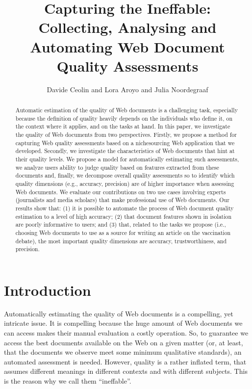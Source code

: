 \documentclass{llncs}
\title{Capturing the Ineffable:\\Collecting, Analysing and Automating Web Document Quality Assessments}
\author{Davide Ceolin\inst{1} and Lora Aroyo\inst{1} and Julia Noordegraaf\inst{2}}
\institute{\email{\{d.ceolin,lora.aroyo\}@vu.nl}\\VU University Amsterdam\\ de Boelelaan 1081a\\ 1081HV\\ Amsterdam, The Netherlands \and \email{j.j.noordegraaf@uva.nl} \\ University of Amsterdam}
\begin{document}
\maketitle
\begin{abstract}
Automatic estimation of the quality of Web documents is a challenging task, especially because the definition of quality heavily depends on the individuals who define it, on the context where it applies, and on the tasks at hand. 
In this paper, we investigate the quality of Web documents from two perspectives. Firstly, we propose a method for capturing Web quality assessments based on a nichesourcing Web application that we developed. Secondly, we investigate the characteristics of Web documents that hint at their quality levels. We propose a model for automatically estimating such assessments, we analyze users ability to judge quality based on features extracted from these documents and, finally, we decompose overall quality assessments so to identify which quality dimensions (e.g., accuracy, precision) are of higher importance when assessing Web documents.
We evaluate our contributions on two use cases involving experts (journalists and media scholars) that make professional use of Web documents. Our results show that: (1) it is possible to automate the process of Web document quality estimation to a level of high accuracy; (2) that document features shown in isolation are poorly informative to users; and (3) that, related to the tasks we propose (i.e., choosing Web documents to use as a source for writing an article on the vaccination debate), the most important quality dimensions are accuracy, trustworthiness, and precision.
\end{abstract}

\section{Introduction}
Automatically estimating the quality of Web documents is a compelling, yet intricate issue. It is compelling because the huge amount of Web documents we can access makes their manual evaluation a costly operation. So, to guarantee we access the best documents available on the Web on a given matter (or, at least, that the documents we observe meet some minimum qualitative standards), an automated assessment is needed.
However, quality is a rather inflated term, that assumes different meanings in different contexts and with different subjects. This is the reason why we call them ``ineffable''.
\end{document}
